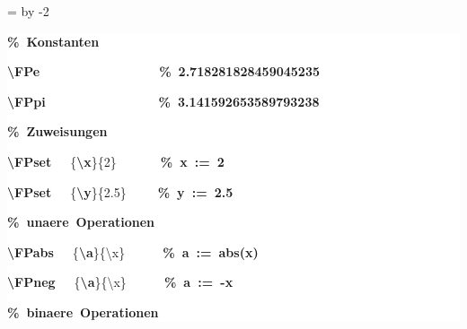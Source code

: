 \begingroup
\ttfamily
{}
=\textwidth
\advance{} by -2\fboxsep
\noindent
\colorbox{background}
{%
\parbox{\dimen255}
{%
\rule[-0.5ex]{0pt}{2.5ex}\hspace*{0.0em}\textcolor{G}{\textbf{\%~Konstanten}}\\
\rule[-0.5ex]{0pt}{2.5ex}\hspace*{0.0em}\textcolor{R}{\textbf{\textbackslash{}FPe}}~~~~~~~~~~~~~~~~~~~\textcolor{G}{\textbf{\%~2.718281828459045235}}\\
\rule[-0.5ex]{0pt}{2.5ex}\hspace*{0.0em}\textcolor{R}{\textbf{\textbackslash{}FPpi}}~~~~~~~~~~~~~~~~~~\textcolor{G}{\textbf{\%~3.141592653589793238}}\\
\rule[-0.5ex]{0pt}{2.5ex}\hspace*{0.0em}\textcolor{G}{\textbf{\%~Zuweisungen}}\\
\rule[-0.5ex]{0pt}{2.5ex}\hspace*{0.0em}\textcolor{R}{\textbf{\textbackslash{}FPset}}~~~\{\textcolor{B}{\textbf{\textbackslash{}x}}\}\{2\}~~~~~~~\textcolor{G}{\textbf{\%~x~:=~2}}\\
\rule[-0.5ex]{0pt}{2.5ex}\hspace*{0.0em}\textcolor{R}{\textbf{\textbackslash{}FPset}}~~~\{\textcolor{B}{\textbf{\textbackslash{}y}}\}\{2.5\}~~~~~\textcolor{G}{\textbf{\%~y~:=~2.5}}\\
\rule[-0.5ex]{0pt}{2.5ex}\hspace*{0.0em}\textcolor{G}{\textbf{\%~unaere~Operationen}}\\
\rule[-0.5ex]{0pt}{2.5ex}\hspace*{0.0em}\textcolor{R}{\textbf{\textbackslash{}FPabs}}~~~\{\textcolor{B}{\textbf{\textbackslash{}a}}\}\{\textbackslash{}x\}~~~~~~\textcolor{G}{\textbf{\%~a~:=~abs(x)}}\\
\rule[-0.5ex]{0pt}{2.5ex}\hspace*{0.0em}\textcolor{R}{\textbf{\textbackslash{}FPneg}}~~~\{\textcolor{B}{\textbf{\textbackslash{}a}}\}\{\textbackslash{}x\}~~~~~~\textcolor{G}{\textbf{\%~a~:=~{-}x}}\\
\rule[-0.5ex]{0pt}{2.5ex}\hspace*{0.0em}\textcolor{G}{\textbf{\%~binaere~Operationen}}\\
}}
